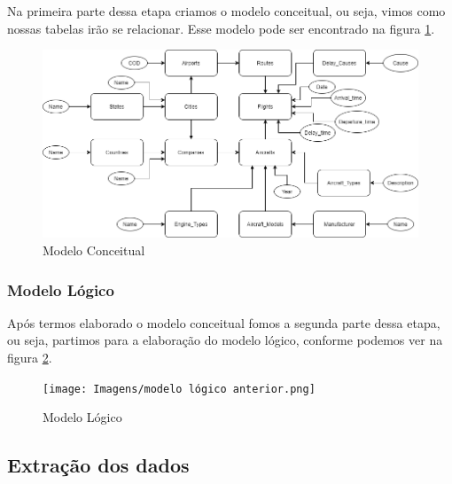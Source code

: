 \documentclass{article}
\begin{document}
	Na primeira parte dessa etapa criamos o modelo conceitual, ou seja, vimos como nossas tabelas irão se relacionar. Esse modelo pode ser encontrado na figura \ref{conceitual}.
	\begin{figure}
		\centering
		\includegraphics[scale = 0.5]{Imagens/modelo conceitual anterior.png}
		\caption{Modelo Conceitual}
		\label{conceitual}
	\end{figure}
	
	\subsubsection{Modelo Lógico}
	
	Após termos elaborado o modelo conceitual fomos a segunda parte dessa etapa, ou seja, partimos para a elaboração do modelo lógico, conforme podemos ver na figura \ref{lógico}.
	\begin{figure}
		\centering
		\texttt{[image: Imagens/modelo lógico anterior.png]}
		\caption{Modelo Lógico}
		\label{lógico}
	\end{figure}
	
	\subsection{Extração dos dados}
	
\end{document}
